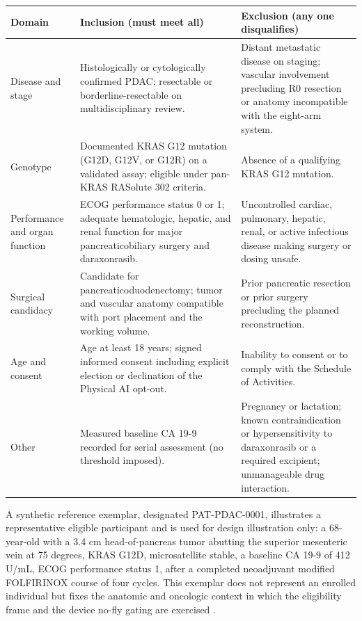 \noindent\begin{tabularx}{\textwidth}{L{3.0cm} Y Y}
\toprule
\textbf{Domain} & \textbf{Inclusion (must meet all)} & \textbf{Exclusion (any one disqualifies)} \\
\midrule
Disease and stage & Histologically or cytologically confirmed PDAC; resectable or borderline-resectable on multidisciplinary review. & Distant metastatic disease on staging; vascular involvement precluding R0 resection or anatomy incompatible with the eight-arm system. \\
\addlinespace
Genotype & Documented KRAS G12 mutation (G12D, G12V, or G12R) on a validated assay; eligible under pan-KRAS RASolute 302 criteria. & Absence of a qualifying KRAS G12 mutation. \\
\addlinespace
Performance and organ function & ECOG performance status 0 or 1; adequate hematologic, hepatic, and renal function for major pancreaticobiliary surgery and daraxonrasib. & Uncontrolled cardiac, pulmonary, hepatic, renal, or active infectious disease making surgery or dosing unsafe. \\
\addlinespace
Surgical candidacy & Candidate for pancreaticoduodenectomy; tumor and vascular anatomy compatible with port placement and the working volume. & Prior pancreatic resection or prior surgery precluding the planned reconstruction. \\
\addlinespace
Age and consent & Age at least 18 years; signed informed consent including explicit election or declination of the Physical AI opt-out. & Inability to consent or to comply with the Schedule of Activities. \\
\addlinespace
Other & Measured baseline CA 19-9 recorded for serial assessment (no threshold imposed). & Pregnancy or lactation; known contraindication or hypersensitivity to daraxonrasib or a required excipient; unmanageable drug interaction. \\
\bottomrule
\end{tabularx}

A synthetic reference exemplar, designated PAT-PDAC-0001, illustrates a
representative eligible participant and is used for design illustration only: a
68-year-old with a 3.4 cm head-of-pancreas tumor abutting the superior mesenteric
vein at 75 degrees, KRAS G12D, microsatellite stable, a baseline CA 19-9 of 412
U/mL, ECOG performance status 1, after a completed neoadjuvant modified FOLFIRINOX
course of four cycles. This exemplar does not represent an enrolled individual but
fixes the anatomic and oncologic context in which the eligibility frame and the
device no-fly gating are exercised \cite{daraxwhipple}.

